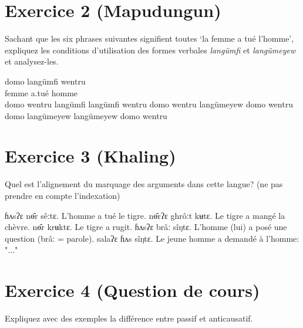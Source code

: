 \documentclass[oldfontcommands,twoside,a4paper,12pt]{article}
\begin{document}
\section*{Exercice 2 (Mapudungun)}

Sachant que les six phrases suivantes signifient toutes `la femme a tué l'homme', expliquez les conditions d'utilisation des formes  verbales \textit{langümfi} et \textit{langümeyew} et analysez-les.

 \begin{exe}
\ex 
\gll domo langümfi wentru \\
femme a.tué homme \\
\ex 
\glt domo wentru langümfi 
\ex 
\glt langümfi wentru domo
\ex 
\glt wentru langümeyew domo
\ex 
\glt wentru domo langümeyew 
\ex 
\glt langümeyew domo wentru
\end{exe} 

\section*{Exercice 3 (Khaling)}
Quel est l'alignement du marquage des arguments dans cette langue? (ne pas prendre en compte l'indexation)
 \begin{exe}
\ex 
\glt ɦʌsʔɛ nɵ̂r sêːtɛ.
\glt L'homme a tué le tigre. 
\ex 
\glt nɵ̂rʔɛ ghrôːt kʉtɛ.
\glt Le tigre a mangé la chèvre.
\ex 
\glt nɵ̂r krʉktɛ.
\glt Le tigre a rugit.
\ex 
\glt ɦʌsʔɛ brâː sîŋtɛ.
\glt L'homme (lui) a posé une question (brâː = parole).
\ex 
\glt salaʔɛ ɦʌs sîŋtɛ.
\glt Le jeune homme a demandé à l'homme: "..."
\end{exe} 
\section*{Exercice 4 (Question de cours)}
Expliquez avec des exemples la différence entre passif et anticausatif.
\end{document}

